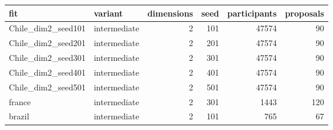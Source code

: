 \begin{tabular}{llrrrr}
\toprule
fit & variant & dimensions & seed & participants & proposals \\
\midrule
Chile_dim2_seed101 & intermediate & 2 & 101 & 47574 & 90 \\
Chile_dim2_seed201 & intermediate & 2 & 201 & 47574 & 90 \\
Chile_dim2_seed301 & intermediate & 2 & 301 & 47574 & 90 \\
Chile_dim2_seed401 & intermediate & 2 & 401 & 47574 & 90 \\
Chile_dim2_seed501 & intermediate & 2 & 501 & 47574 & 90 \\
france & intermediate & 2 & 301 & 1443 & 120 \\
brazil & intermediate & 2 & 101 & 765 & 67 \\
\bottomrule
\end{tabular}
